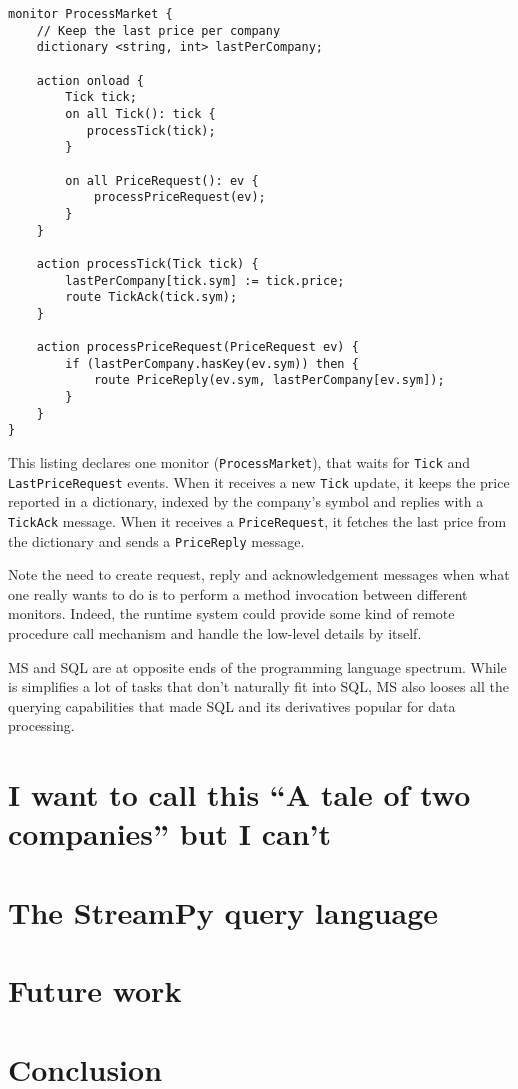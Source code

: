 \documentclass{report}
\begin{document}
\begin{verbatim}
monitor ProcessMarket {
    // Keep the last price per company
    dictionary <string, int> lastPerCompany;

    action onload {
        Tick tick;
        on all Tick(): tick {
           processTick(tick);
        }

        on all PriceRequest(): ev {
            processPriceRequest(ev);
        }
    }

    action processTick(Tick tick) {
        lastPerCompany[tick.sym] := tick.price;
        route TickAck(tick.sym);
    }

    action processPriceRequest(PriceRequest ev) {
        if (lastPerCompany.hasKey(ev.sym)) then {
            route PriceReply(ev.sym, lastPerCompany[ev.sym]);
        }
    }
}
\end{verbatim}

This listing declares one monitor (\verb=ProcessMarket=), that waits
for \verb=Tick= and \verb=LastPriceRequest= events. When it receives a
new \verb=Tick= update, it keeps the price reported in a dictionary,
indexed by the company's symbol and replies with a \verb=TickAck=
message. When it receives a \verb=PriceRequest=, it fetches the last
price from the dictionary and sends a \verb=PriceReply= message.

Note the need to create request, reply and acknowledgement messages
when what one really wants to do is to perform a method invocation
between different monitors. Indeed, the runtime system could provide
some kind of remote procedure call mechanism and handle the low-level
details by itself.

MS and SQL are at opposite ends of the programming language
spectrum. While is simplifies a lot of tasks that don't naturally fit
into SQL, MS also looses all the querying capabilities that made SQL
and its derivatives popular for data processing.

\chapter{I want to call this ``A tale of two companies'' but I can't}
\label{motivation}

\chapter{The StreamPy query language}\label{streampy}

\chapter{Future work}\label{future-work}

\chapter{Conclusion}\label{conclusion}
\end{document}
